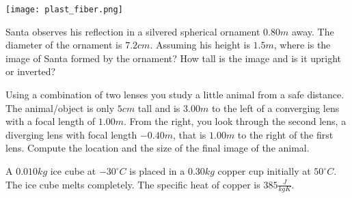 \documentclass{exam}
\begin{document}
\begin{questions}
\texttt{[image: plast\_fiber.png]}



\clearpage

\question[15]
Santa observes his reflection in a silvered spherical ornament $0.80m$ away. The diameter of the ornament is $7.2cm$. Assuming his height is $1.5m$, where is the image of Santa formed by the ornament? How tall is the image and is it upright or inverted?

\clearpage



\question [20] 
Using a combination of two lenses you study a little animal from a safe distance. The animal/object is only $5cm$ tall and is $3.00m$ to the left of a converging lens with a focal length of $1.00m$. From the right, you look through the second lens, a diverging lens with focal length $-0.40m$, that is $1.00m$ to the right of the first lens. Compute the location and the size of the final image of the animal.
\clearpage


\question [25] 
A $0.010kg$ ice cube at $-30^\circ C$ is placed in a $0.30kg$ copper cup initially at $50^\circ C$. The ice cube melts completely. The specific heat of copper is $385\frac{J}{kgK}$.
\end{questions}
\end{document}
